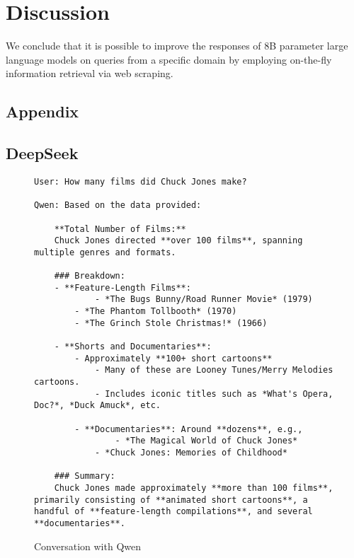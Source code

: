 \documentclass[fleqn,moreauthors,10pt]{ds_report}
\begin{document}
\section*{Discussion}

We conclude that it is possible to improve the responses of 8B parameter large language models on queries from a specific domain by employing on-the-fly information retrieval via web scraping.  






\newpage
\begin{appendix}

\section*{Appendix}
\label{append}

\subsection*{DeepSeek}

\begin{figure*}
\begin{lstlisting}
User: How many films did Chuck Jones make?

Qwen: Based on the data provided:

	**Total Number of Films:**  
	Chuck Jones directed **over 100 films**, spanning multiple genres and formats.

	### Breakdown:
	- **Feature-Length Films**: 
    		- *The Bugs Bunny/Road Runner Movie* (1979)
	    - *The Phantom Tollbooth* (1970)
	    - *The Grinch Stole Christmas!* (1966)

	- **Shorts and Documentaries**:
	    - Approximately **100+ short cartoons**
	        - Many of these are Looney Tunes/Merry Melodies cartoons.
	        - Includes iconic titles such as *What's Opera, Doc?*, *Duck Amuck*, etc.
    
	    - **Documentaries**: Around **dozens**, e.g.,
	    	    - *The Magical World of Chuck Jones*
	        - *Chuck Jones: Memories of Childhood*

	### Summary:
	Chuck Jones made approximately **more than 100 films**, primarily consisting of **animated short cartoons**, a handful of **feature-length compilations**, and several **documentaries**.
\end{lstlisting}
\caption{Conversation with Qwen}
\label{qwenconvo}
\end{figure*}



 


\end{appendix}
\end{document}
